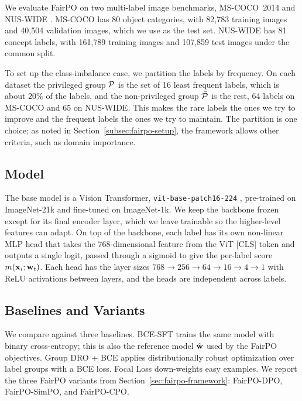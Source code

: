 We evaluate FairPO on two multi-label image benchmarks, MS-COCO~2014
\citep{lin2015coco} and NUS-WIDE \citep{chua2009nuswide}.
MS-COCO has 80 object categories, with 82{,}783 training images and 40{,}504
validation images, which we use as the test set. NUS-WIDE has 81 concept labels,
with 161{,}789 training images and 107{,}859 test images under the common split.

To set up the class-imbalance case, we partition the labels by frequency. On each
dataset the privileged group $\mathcal{P}$ is the set of 16 least frequent labels,
which is about $20\%$ of the labels, and the non-privileged group
$\bar{\mathcal{P}}$ is the rest, 64 labels on MS-COCO and 65 on NUS-WIDE. This makes
the rare labels the ones we try to improve and the frequent labels the ones we try
to maintain. The partition is one choice; as noted in
Section~\ref{subsec:fairpo-setup}, the framework allows other criteria, such as
domain importance.

\subsection{Model}
\label{subsec:fairpo-model}

The base model is a Vision Transformer, \texttt{vit-base-patch16-224}
\citep{dosovitskiy2021vit}, pre-trained on ImageNet-21k and
fine-tuned on ImageNet-1k. We keep the backbone frozen except for its final encoder
layer, which we leave trainable so the higher-level features can adapt. On top of
the backbone, each label has its own non-linear MLP head that takes the
$768$-dimensional feature from the ViT [CLS] token and outputs a single logit,
passed through a sigmoid to give the per-label score $m(\mathbf{x}_i;
\mathbf{w}_t)$. Each head has the layer sizes $768 \rightarrow 256 \rightarrow 64
\rightarrow 16 \rightarrow 4 \rightarrow 1$ with ReLU activations between layers,
and the heads are independent across labels.

\subsection{Baselines and Variants}
\label{subsec:fairpo-baselines}

We compare against three baselines. BCE-SFT trains the same model with binary
cross-entropy; this is also the reference model $\hat{\mathbf{w}}$ used by the FairPO
objectives. Group DRO + BCE \citep{sagawa2020dro} applies
distributionally robust optimization over label groups with a BCE loss. Focal Loss
\citep{lin2018focallossdenseobject} down-weights easy examples. We report the three
FairPO variants from Section~\ref{sec:fairpo-framework}: FairPO-DPO, FairPO-SimPO,
and FairPO-CPO.

